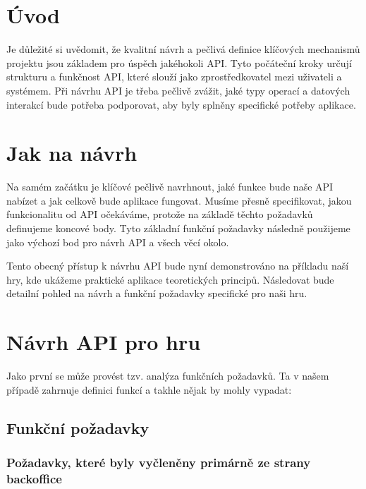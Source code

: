 
\section{Úvod}\label{sec:api-goal}

Je důležité si uvědomit, že kvalitní návrh a pečlivá definice klíčových mechanismů projektu jsou základem pro úspěch jakéhokoli API. Tyto počáteční kroky určují strukturu a funkčnost API, které slouží jako zprostředkovatel mezi uživateli a systémem. Při návrhu API je třeba pečlivě zvážit, jaké typy operací a datových interakcí bude potřeba podporovat, aby byly splněny specifické potřeby aplikace.

\section{Jak na návrh}\label{sec:api-how}

Na samém začátku je klíčové pečlivě navrhnout, jaké funkce bude naše API nabízet a jak celkově bude aplikace fungovat. Musíme přesně specifikovat, jakou funkcionalitu od API očekáváme, protože na základě těchto požadavků definujeme koncové body. Tyto základní funkční požadavky následně použijeme jako výchozí bod pro návrh API a všech věcí okolo.

Tento obecný přístup k návrhu API bude nyní demonstrováno na příkladu naší hry, kde ukážeme praktické aplikace teoretických principů. Následovat bude detailní pohled na návrh a funkční požadavky specifické pro naši hru.

\section{Návrh API pro hru}\label{sec:api-design}

Jako první se může provést tzv. analýza funkčních požadavků. Ta v našem případě zahrnuje definici funkcí a takhle nějak by mohly vypadat:

\subsection{Funkční požadavky}

\subsubsection*{Požadavky, které byly vyčleněny primárně ze strany backoffice}


